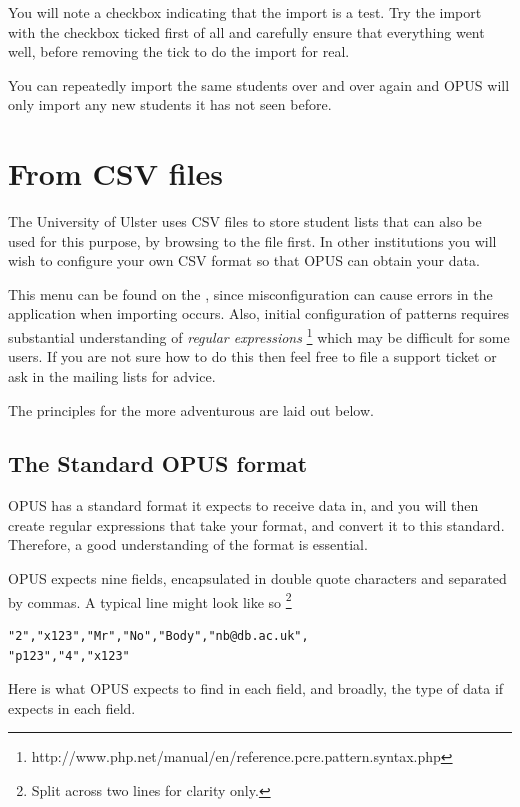 \documentclass[12 pt]{book}
\begin{document}
You will note a checkbox indicating that the import is a test. Try the import with the checkbox
ticked first of all and carefully ensure that everything went well, before removing the tick
to do the import for real.

You can repeatedly import the same students over and over again and OPUS will only import
any new students it has not seen before.

\section{From CSV files}

The University of Ulster uses CSV files to store student lists that can also be used for this
purpose, by browsing to the file first. In other institutions you will wish to configure your
own CSV format so that OPUS can obtain your data.

This menu can be found on the ,
since misconfiguration can cause errors in the application when importing
occurs. Also, initial configuration of patterns requires substantial
understanding of \emph{regular expressions}%
\footnote{http://www.php.net/manual/en/reference.pcre.pattern.syntax.php}
which may be difficult for some users. If you are not sure how to do this then
feel free to file a support ticket or ask in the mailing lists for advice.

The principles for the more adventurous are laid out below.

\subsection{The Standard OPUS format}

OPUS has a standard format it expects to receive data in, and you will then
create regular expressions that take your format, and convert it to this
standard. Therefore, a good understanding of the format is essential.

OPUS expects nine fields, encapsulated in double quote characters and
separated by commas. A typical line might look like so%
\footnote{Split across two lines for clarity only.}

\begin{lstlisting}
"2","x123","Mr","No","Body","nb@db.ac.uk",
"p123","4","x123"
\end{lstlisting}

Here is what OPUS expects to find in each field, and broadly, the type of
data if expects in each field.
\end{document}
